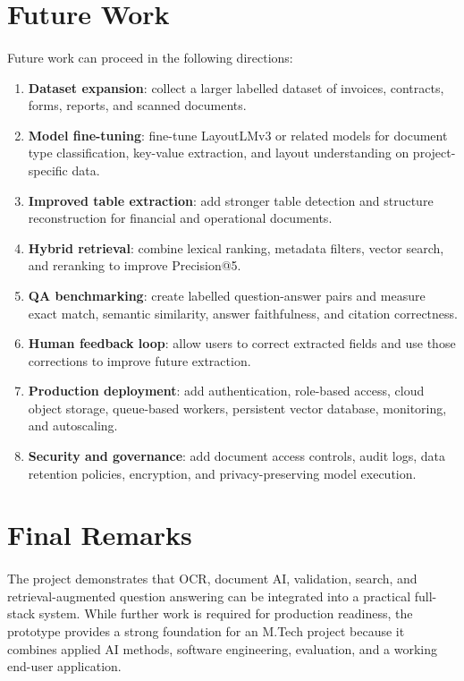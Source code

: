\section{Future Work}
\paragraph{} Future work can proceed in the following directions:

\begin{enumerate}
    \item \textbf{Dataset expansion}: collect a larger labelled dataset of invoices, contracts, forms, reports, and scanned documents.
    \item \textbf{Model fine-tuning}: fine-tune LayoutLMv3 or related models for document type classification, key-value extraction, and layout understanding on project-specific data.
    \item \textbf{Improved table extraction}: add stronger table detection and structure reconstruction for financial and operational documents.
    \item \textbf{Hybrid retrieval}: combine lexical ranking, metadata filters, vector search, and reranking to improve Precision@5.
    \item \textbf{QA benchmarking}: create labelled question-answer pairs and measure exact match, semantic similarity, answer faithfulness, and citation correctness.
    \item \textbf{Human feedback loop}: allow users to correct extracted fields and use those corrections to improve future extraction.
    \item \textbf{Production deployment}: add authentication, role-based access, cloud object storage, queue-based workers, persistent vector database, monitoring, and autoscaling.
    \item \textbf{Security and governance}: add document access controls, audit logs, data retention policies, encryption, and privacy-preserving model execution.
\end{enumerate}

\section{Final Remarks}
\paragraph{} The project demonstrates that OCR, document AI, validation, search, and retrieval-augmented question answering can be integrated into a practical full-stack system. While further work is required for production readiness, the prototype provides a strong foundation for an M.Tech project because it combines applied AI methods, software engineering, evaluation, and a working end-user application.
